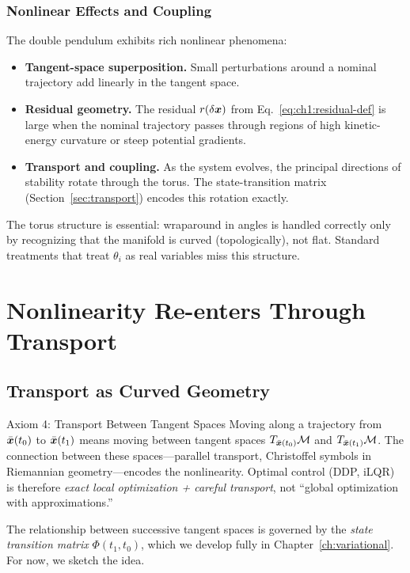 \subsubsection{Nonlinear Effects and Coupling}

The double pendulum exhibits rich nonlinear phenomena:
\begin{itemize}
\item \textbf{Tangent-space superposition.} Small perturbations around a nominal trajectory add linearly in the tangent space.
\item \textbf{Residual geometry.} The residual $r(\delta\bm{x})$ from Eq.~\eqref{eq:ch1:residual-def} is large when
the nominal trajectory passes through regions of high kinetic-energy curvature or steep potential gradients.
\item \textbf{Transport and coupling.} As the system evolves, the principal directions of stability rotate
through the torus. The state-transition matrix (Section~\ref{sec:transport}) encodes this rotation exactly.
\end{itemize}

The torus structure is essential: wraparound in angles is handled correctly only by recognizing
that the manifold is curved (topologically), not flat. Standard treatments that treat $\theta_i$ as
real variables miss this structure.


\section{Nonlinearity Re-enters Through Transport}

\subsection{Transport as Curved Geometry}

\begin{axiombox}{Axiom 4: Transport Between Tangent Spaces}
Moving along a trajectory from $\bar{\bm{x}}(t_0)$ to $\bar{\bm{x}}(t_1)$ means moving between
tangent spaces $T_{\bar{\bm{x}}(t_0)}\mathcal{M}$ and $T_{\bar{\bm{x}}(t_1)}\mathcal{M}$. The
connection between these spaces---parallel transport, Christoffel symbols in Riemannian
geometry---encodes the nonlinearity. Optimal control (DDP, iLQR) is therefore
\emph{exact local optimization + careful transport}, not ``global optimization with
approximations.''
\end{axiombox}

The relationship between successive tangent spaces is governed by the \emph{state
transition matrix} $\Phi(t_1, t_0)$, which we develop fully in
Chapter~\ref{ch:variational}. For now, we sketch the idea.

